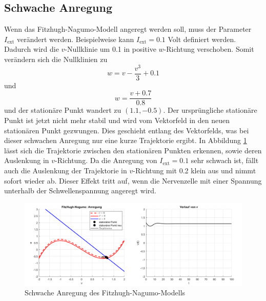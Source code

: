 \begin{refsection}
\subsection{Schwache Anregung}
Wenn das Fitzhugh-Nagumo-Modell angeregt werden soll, muss der Parameter $I_\text{ext}$ verändert werden.
Beispielweise kann $I_\text{ext} = 0.1$ Volt definiert werden.
Dadurch wird die $v$-Nullklinie um 0.1 in positive $w$-Richtung verschoben.
Somit verändern sich die Nullklinien zu \[ w = v - \frac{v^3}{3} + 0.1\]
und \[w = \frac{v + 0.7}{0.8}\] und der stationäre Punkt wandert zu $(1.1 ,-0.5)$.
Der ursprüngliche stationäre Punkt ist jetzt nicht mehr stabil und wird vom Vektorfeld in den neuen stationären Punkt
gezwungen.
Dies geschieht entlang des Vektorfelds, was bei dieser schwachen Anregung nur eine kurze Trajektorie ergibt.
In Abbildung \ref{fig:schwacheAnregung} lässt sich die Trajektorie zwischen den stationären Punkten erkennen, sowie
deren Auslenkung in $v$-Richtung.
Da die Anregung von $I_\text{ext} = 0.1$ sehr schwach ist, fällt auch die Auslenkung der Trajektorie in $v$-Richtung mit 0.2 klein aus und
nimmt sofort wieder ab. 
Dieser Effekt tritt auf, wenn die Nervenzelle mit einer Spannung unterhalb der Schwellenspannung angeregt wird.
\begin{figure}[h]
    \centering
    \includegraphics[width=\textwidth]{papers/nerven/Bilder/schwacheAnregung.png}
    \caption{Schwache Anregung des Fitzhugh-Nagumo-Modells}
    \label{fig:schwacheAnregung}
\end{figure}

\end{refsection}
